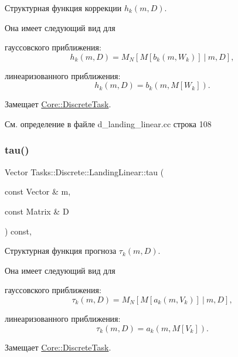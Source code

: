 Структурная функция коррекции $h_k(m, D)$. 

Она имеет следующий вид для


\begin{DoxyItemize}
\item гауссовского приближения\+: \[h_k(m, D) = M_N[M[b_k(m, W_k)] \ |\ m, D],\]
\item линеаризованного приближения\+: \[h_k(m, D) = b_k(m, M[W_k]).\] 
\end{DoxyItemize}

Замещает \hyperlink{class_core_1_1_discrete_task_a09eb964bfe445c1905758bfff4fc1537}{Core\+::\+Discrete\+Task}.



См. определение в файле d\+\_\+landing\+\_\+linear.\+cc строка 108

\hypertarget{class_tasks_1_1_discrete_1_1_landing_linear_a8f2022967fae3dde3e7d2df3f7fa98f8}{}\label{class_tasks_1_1_discrete_1_1_landing_linear_a8f2022967fae3dde3e7d2df3f7fa98f8} 
\subsubsection{\texorpdfstring{tau()}{tau()}}
{\footnotesize\ttfamily Vector Tasks\+::\+Discrete\+::\+Landing\+Linear\+::tau (\begin{DoxyParamCaption}\item[{const Vector \&}]{m,  }\item[{const Matrix \&}]{D }\end{DoxyParamCaption}) const\hspace{0.3cm}{\ttfamily [override]}, {\ttfamily [virtual]}}



Структурная функция прогноза $\tau_k(m, D)$. 

Она имеет следующий вид для


\begin{DoxyItemize}
\item гауссовского приближения\+: \[\tau_k(m, D) = M_N[M[a_k(m, V_k)] \ |\ m, D],\]
\item линеаризованного приближения\+: \[\tau_k(m, D) = a_k(m, M[V_k]).\] 
\end{DoxyItemize}

Замещает \hyperlink{class_core_1_1_discrete_task_aed780d7286bc88d0a2debb585601b3ca}{Core\+::\+Discrete\+Task}.



